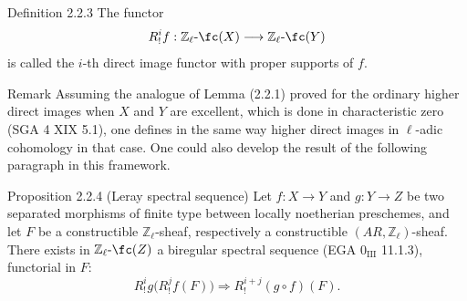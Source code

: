 \begin{statement}{Definition 2.2.3}
The functor
\[
R^i_!f:\mathbb Z_\ell\text{-}\fc(X)\longrightarrow \mathbb Z_\ell\text{-}\fc(Y)
\]
is called the \(i\)-th direct image functor with proper supports of \(f\).
\end{statement}

\begin{statement}{Remark}
Assuming the analogue of Lemma (2.2.1) proved for the ordinary higher direct images when \(X\) and \(Y\) are excellent, which is done in characteristic zero (SGA 4 XIX 5.1), one defines in the same way higher direct images in \(\ell\)-adic cohomology in that case. One could also develop the result of the following paragraph in this framework.
\end{statement}

\begin{statement}{Proposition 2.2.4 (Leray spectral sequence)}
Let \(f:X\to Y\) and \(g:Y\to Z\) be two separated morphisms of finite type between locally noetherian preschemes, and let \(F\) be a constructible \(\mathbb Z_\ell\)-sheaf, respectively a constructible \((AR,\mathbb Z_\ell)\)-sheaf. There exists in \(\mathbb Z_\ell\text{-}\fc(Z)\) a biregular spectral sequence (EGA \(0_{\mathrm{III}}\) 11.1.3), functorial in \(F\):
\[
R^i_!g\bigl(R^j_!f(F)\bigr)\Longrightarrow R^{i+j}_!(g\circ f)(F).
\]
\end{statement}

